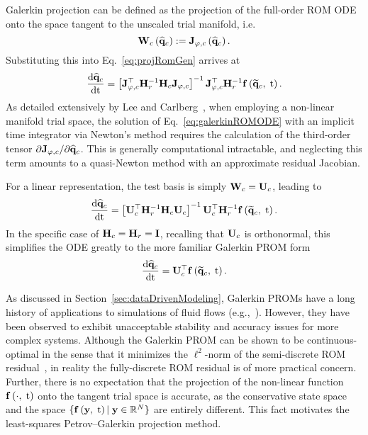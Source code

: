 Galerkin projection can be defined as the projection of the full-order ROM ODE onto the space tangent to the unscaled trial manifold, i.e.
%
\begin{equation}
    \testBasisCons\left(\consVecCoef\right) \defEq \jacobTrialConsFunc{\consVecCoef}.
\end{equation}
%
Substituting this into Eq.~\ref{eq:projRomGen} arrives at
%
\begin{equation}\label{eq:galerkinROMODE}
    \ode{\consVecCoef}{\timeVar} = \left[\jacobTrialCons^\top \resScaleInv \consScale \jacobTrialCons\right]^{-1} \jacobTrialCons^\top \resScaleInv \rhsFunc{\consVecRom, \; \timeVar}.
\end{equation}
%
As detailed extensively by Lee and Carlberg~\cite{Lee2020}, when employing a non-linear manifold trial space, the solution of Eq.~\ref{eq:galerkinROMODE} with an implicit time integrator via Newton's method requires the calculation of the third-order tensor $\partial \mathbf{J}_{\varphi,c} / \partial \mathbf{\widehat{q}}_{c}$. This is generally computational intractable, and neglecting this term amounts to a quasi-Newton method with an approximate residual Jacobian.

For a linear representation, the test basis is simply $\testBasisCons = \consTrial$, leading to
%
\begin{equation}\label{eq:galerkinROMODELinear}
	\ode{\consVecCoef}{\timeVar} = \left[\consTrial^\top \resScaleInv \consScale \consTrial\right]^{-1} \consTrial^\top \resScaleInv \rhsFunc{\consVecRom, \; \timeVar}.
\end{equation}
%
In the specific case of $\consScale = \resScale = \identMat$, recalling that $\consTrial$ is orthonormal, this simplifies the ODE greatly to the more familiar Galerkin PROM form
%
\begin{equation}\label{eq:galerkinROMODELinearSimple}
    \ode{\consVecCoef}{\timeVar} = \consTrial^\top \rhsFunc{\consVecRom, \; \timeVar}.
\end{equation}

As discussed in Section~\ref{sec:dataDrivenModeling}, Galerkin PROMs have a long history of applications to simulations of fluid flows (e.g.,~\cite{Aubry1988,Cazemier1998,BuiThanh2007}). However, they have been observed to exhibit unacceptable stability and accuracy issues for more complex systems. Although the Galerkin PROM can be shown to be continuous-optimal in the sense that it minimizes the $\ell^2$-norm of the semi-discrete ROM residual~\cite{Carlberg2017}, in reality the fully-discrete ROM residual is of more practical concern. Further, there is no expectation that the projection of the non-linear function $\mathbf{f} \left(\cdot, \; \text{t}\right)$ onto the tangent trial space is accurate, as the conservative state space and the space $\{\mathbf{f} \left(\mathbf{y}, \; \text{t}\right) \vert \; \mathbf{y} \in \mathbb{R}^{N} \}$ are entirely different. This fact motivates the least-squares Petrov--Galerkin projection method.

